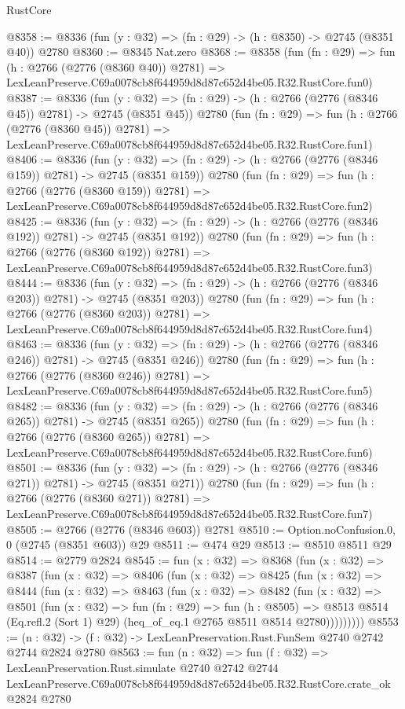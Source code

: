 \begin{lexlean}{RustCore}
\begin{coremodule}
@8358 := @8336 (fun (y : @32) => (fn : @29) -> (h : @8350) -> @2745 (@8351 @40)) @2780
@8360 := @8345 Nat.zero
@8368 := @8358
    (fun (fn : @29) =>
    fun (h : @2766 (@2776 (@8360 @40)) @2781) =>
    LexLeanPreserve.C69a0078cb8f644959d8d87c652d4be05.R32.RustCore.fun0)
@8387 := @8336
    (fun (y : @32) => (fn : @29) -> (h : @2766 (@2776 (@8346 @45)) @2781) -> @2745 (@8351 @45))
    @2780
    (fun (fn : @29) =>
    fun (h : @2766 (@2776 (@8360 @45)) @2781) =>
    LexLeanPreserve.C69a0078cb8f644959d8d87c652d4be05.R32.RustCore.fun1)
@8406 := @8336
    (fun (y : @32) => (fn : @29) -> (h : @2766 (@2776 (@8346 @159)) @2781) -> @2745 (@8351 @159))
    @2780
    (fun (fn : @29) =>
    fun (h : @2766 (@2776 (@8360 @159)) @2781) =>
    LexLeanPreserve.C69a0078cb8f644959d8d87c652d4be05.R32.RustCore.fun2)
@8425 := @8336
    (fun (y : @32) => (fn : @29) -> (h : @2766 (@2776 (@8346 @192)) @2781) -> @2745 (@8351 @192))
    @2780
    (fun (fn : @29) =>
    fun (h : @2766 (@2776 (@8360 @192)) @2781) =>
    LexLeanPreserve.C69a0078cb8f644959d8d87c652d4be05.R32.RustCore.fun3)
@8444 := @8336
    (fun (y : @32) => (fn : @29) -> (h : @2766 (@2776 (@8346 @203)) @2781) -> @2745 (@8351 @203))
    @2780
    (fun (fn : @29) =>
    fun (h : @2766 (@2776 (@8360 @203)) @2781) =>
    LexLeanPreserve.C69a0078cb8f644959d8d87c652d4be05.R32.RustCore.fun4)
@8463 := @8336
    (fun (y : @32) => (fn : @29) -> (h : @2766 (@2776 (@8346 @246)) @2781) -> @2745 (@8351 @246))
    @2780
    (fun (fn : @29) =>
    fun (h : @2766 (@2776 (@8360 @246)) @2781) =>
    LexLeanPreserve.C69a0078cb8f644959d8d87c652d4be05.R32.RustCore.fun5)
@8482 := @8336
    (fun (y : @32) => (fn : @29) -> (h : @2766 (@2776 (@8346 @265)) @2781) -> @2745 (@8351 @265))
    @2780
    (fun (fn : @29) =>
    fun (h : @2766 (@2776 (@8360 @265)) @2781) =>
    LexLeanPreserve.C69a0078cb8f644959d8d87c652d4be05.R32.RustCore.fun6)
@8501 := @8336
    (fun (y : @32) => (fn : @29) -> (h : @2766 (@2776 (@8346 @271)) @2781) -> @2745 (@8351 @271))
    @2780
    (fun (fn : @29) =>
    fun (h : @2766 (@2776 (@8360 @271)) @2781) =>
    LexLeanPreserve.C69a0078cb8f644959d8d87c652d4be05.R32.RustCore.fun7)
@8505 := @2766 (@2776 (@8346 @603)) @2781
@8510 := Option.noConfusion.{0, 0} (@2745 (@8351 @603)) @29
@8511 := @474 @29
@8513 := @8510 @8511 @29
@8514 := @2779 @2824
@8545 := fun (x : @32) =>
  @8368
    (fun (x : @32) =>
    @8387
      (fun (x : @32) =>
      @8406
        (fun (x : @32) =>
        @8425
          (fun (x : @32) =>
          @8444
            (fun (x : @32) =>
            @8463
              (fun (x : @32) =>
              @8482
                (fun (x : @32) =>
                @8501
                  (fun (x : @32) =>
                  fun (fn : @29) =>
                  fun (h : @8505) =>
                  @8513
                    @8514
                    (Eq.refl.{2} (Sort 1) @29)
                    (heq_of_eq.{1} @2765 @8511 @8514 @2780)))))))))
@8553 := (n : @32) -> (f : @32) -> LexLeanPreservation.Rust.FunSem @2740 @2742 @2744 @2824 @2780
@8563 := fun (n : @32) =>
  fun (f : @32) =>
  LexLeanPreservation.Rust.simulate
    @2740
    @2742
    @2744
    LexLeanPreserve.C69a0078cb8f644959d8d87c652d4be05.R32.RustCore.crate_ok
    @2824
    @2780
\end{coremodule}
\end{lexlean}
